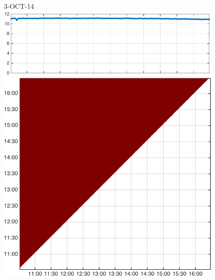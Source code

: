 \begin{figure}
\begin{minipage}[c]{\mylength}
\end{minipage}
\begin{minipage}[c]{\mylength}
\centering \scriptsize 3-OCT-14 \\
\includegraphics[valign=t,trim=0 0 5pt 0,angle=90,origin=tr,width=\sunintwidth,totalheight=\eventheight]{events/20141003-intensity.pdf}
\includegraphics[valign=t,width=\eventswidth]{events/20141003-maxGain-local-events.png}

\end{minipage}
\end{figure}
